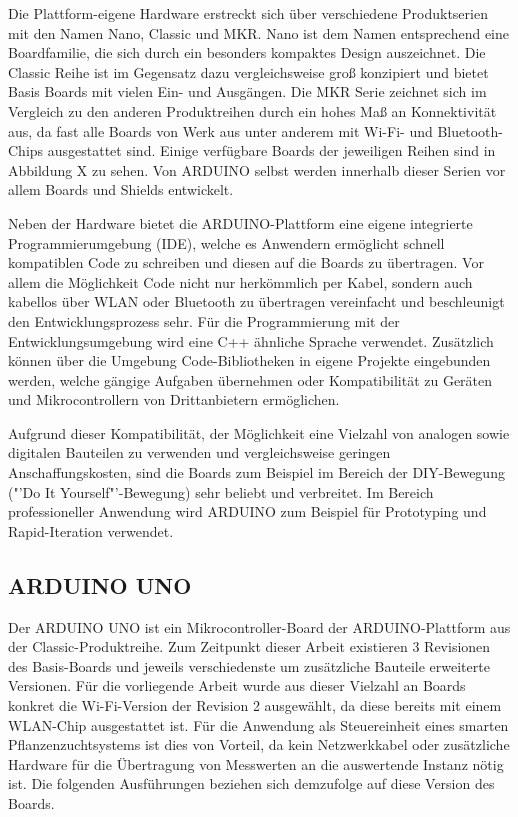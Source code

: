 \documentclass[
    load-dhbw-templates,
    load-preamble = true,
    auto-intro-pages = all,
    add-tocs-to-toc,
    debug = true,
    language = english,
    mainlanguage = ngerman,
    add-bibliography,
    bib-file = dhbw-source.bib,
    biblatex/style = alphabetic, 
]{iodhbwm}
\begin{document}
        Die Plattform-eigene Hardware erstreckt sich über verschiedene Produktserien mit den Namen Nano, Classic und MKR. Nano ist dem Namen entsprechend eine Boardfamilie, die sich durch ein besonders kompaktes Design auszeichnet. Die Classic Reihe ist im Gegensatz dazu vergleichsweise groß konzipiert und bietet Basis Boards mit vielen Ein- und Ausgängen. Die MKR Serie zeichnet sich im Vergleich zu den anderen Produktreihen durch ein hohes Maß an Konnektivität aus, da fast alle Boards von Werk aus unter anderem mit Wi-Fi- und Bluetooth-Chips ausgestattet sind. Einige verfügbare Boards der jeweiligen Reihen sind in Abbildung X zu sehen. %
        Von ARDUINO selbst werden innerhalb dieser Serien vor allem Boards und Shields entwickelt.%

        Neben der Hardware bietet die ARDUINO-Plattform eine eigene integrierte Programmierumgebung (IDE), welche es Anwendern ermöglicht schnell kompatiblen Code zu schreiben und diesen auf die Boards zu übertragen. Vor allem die Möglichkeit Code nicht nur herkömmlich per Kabel, sondern auch kabellos über WLAN oder Bluetooth zu übertragen vereinfacht und beschleunigt den Entwicklungsprozess sehr. Für die Programmierung mit der Entwicklungsumgebung wird eine C++ ähnliche Sprache verwendet. Zusätzlich können über die Umgebung Code-Bibliotheken in eigene Projekte eingebunden werden, welche gängige Aufgaben übernehmen oder Kompatibilität zu Geräten und Mikrocontrollern von Drittanbietern ermöglichen.%
        
        Aufgrund dieser Kompatibilität, der Möglichkeit eine Vielzahl von analogen sowie digitalen Bauteilen zu verwenden und vergleichsweise geringen Anschaffungskosten, sind die Boards zum Beispiel im Bereich der DIY-Bewegung ("'Do It Yourself"'-Bewegung) sehr beliebt und verbreitet.
        Im Bereich professioneller Anwendung wird ARDUINO zum Beispiel für Prototyping und Rapid-Iteration verwendet.%


        \subsection{ARDUINO UNO}


        Der ARDUINO UNO ist ein Mikrocontroller-Board der ARDUINO-Plattform aus der Classic-Produktreihe. Zum Zeitpunkt dieser Arbeit existieren 3 Revisionen des Basis-Boards und jeweils verschiedenste um zusätzliche Bauteile erweiterte Versionen. Für die vorliegende Arbeit wurde aus dieser Vielzahl an Boards konkret die Wi-Fi-Version der Revision 2 ausgewählt, da diese bereits mit einem WLAN-Chip ausgestattet ist. Für die Anwendung als Steuereinheit eines smarten Pflanzenzuchtsystems ist dies von Vorteil, da kein Netzwerkkabel oder zusätzliche Hardware für die Übertragung von Messwerten an die auswertende Instanz nötig ist.
        Die folgenden Ausführungen beziehen sich demzufolge auf diese Version des Boards.
\end{document}
